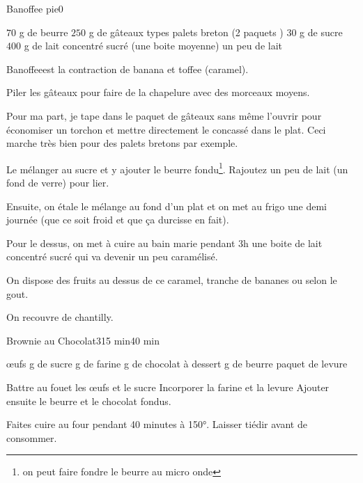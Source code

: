 \begin{recette}{Banoffee pie}{0}{}{}
\begin{ingredients}
\ingredient $70$ g de beurre
\ingredient $250$ g de gâteaux types palets breton (2 paquets )
\ingredient $30$ g de sucre
\ingredient $400$ g de lait concentré sucré (une boite moyenne)
\ingredient un peu de lait
\end{ingredients}

\begin{remarque}
\og Banoffee\fg est la contraction de banana et toffee (caramel).
\end{remarque}

\begin{preparation}
\etape Piler les gâteaux pour faire de la chapelure avec des morceaux moyens.

\begin{remarque}
Pour ma part, je tape dans le paquet de gâteaux sans même l'ouvrir pour économiser un torchon et mettre directement le concassé dans le plat. Ceci marche très bien pour des palets bretons par exemple.
\end{remarque}

\etape Le mélanger au sucre et y ajouter le beurre fondu\footnote{on peut faire fondre le beurre au micro onde}. Rajoutez un peu de lait (un fond de verre) pour lier.

\etape Ensuite, on étale le mélange au fond d'un plat et on met au frigo une demi journée (que ce soit froid et que ça durcisse en fait).

\etape Pour le dessus, on met à cuire au bain marie pendant 3h une boite de lait concentré sucré qui va devenir un peu caramélisé.

\etape On dispose des fruits au dessus de ce caramel, tranche de bananes ou selon le gout.

\etape On recouvre de chantilly.
\end{preparation}

\end{recette}

\begin{recette}{Brownie au Chocolat}{3}{15 min}{40 min}
\begin{ingredients}
 œufs
 g de sucre
 g de farine
 g de chocolat à dessert
 g de beurre
 paquet de levure
\end{ingredients}

\begin{preparation}
\etape Battre au fouet les œufs et le sucre
\etape Incorporer la farine et la levure
\etape Ajouter ensuite le beurre et le chocolat fondus.
\end{preparation}

\begin{cuisson}
Faites cuire au four pendant 40 minutes à 150°.
Laisser tiédir avant de consommer. 
\end{cuisson}
\end{recette}

